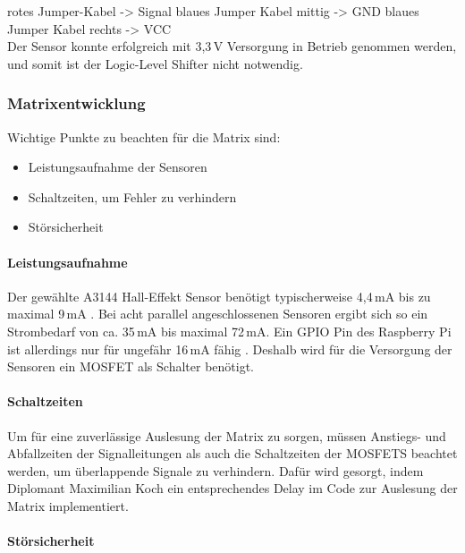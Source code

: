 rotes Jumper-Kabel 		-> Signal \newline
blaues Jumper Kabel mittig	-> GND \newline
blaues Jumper Kabel rechts	-> VCC \newline\\
Der Sensor konnte erfolgreich mit 3,3\,V Versorgung in Betrieb genommen werden, und somit ist der Logic-Level Shifter nicht notwendig.

\newpage

\subsubsection{Matrixentwicklung}
Wichtige Punkte zu beachten für die Matrix sind:
\begin{itemize}
	\item Leistungsaufnahme der Sensoren
	\item Schaltzeiten, um Fehler zu verhindern
	\item Störsicherheit
\end{itemize}

\paragraph{Leistungsaufnahme}

Der gewählte A3144 Hall-Effekt Sensor benötigt typischerweise 4,4\,mA bis zu maximal 9\,mA \cite{allegro_a3144}. Bei acht parallel angeschlossenen Sensoren ergibt sich so ein Strombedarf von ca. 35\,mA bis maximal 72\,mA. Ein GPIO Pin des Raspberry Pi ist allerdings nur für ungefähr 16\,mA fähig \cite{elkomp_raspi_gpio}. Deshalb wird für die Versorgung der Sensoren ein MOSFET als Schalter benötigt. \newline

\paragraph{Schaltzeiten}
\label{sec:schaltzeiten}

Um für eine zuverlässige Auslesung der Matrix zu sorgen, müssen Anstiegs- und Abfallzeiten der Signalleitungen als auch die Schaltzeiten der MOSFETS beachtet werden, um überlappende Signale zu verhindern.
Dafür wird gesorgt, indem Diplomant Maximilian Koch ein entsprechendes Delay im Code zur Auslesung der Matrix implementiert. \newline

\paragraph{Störsicherheit}

